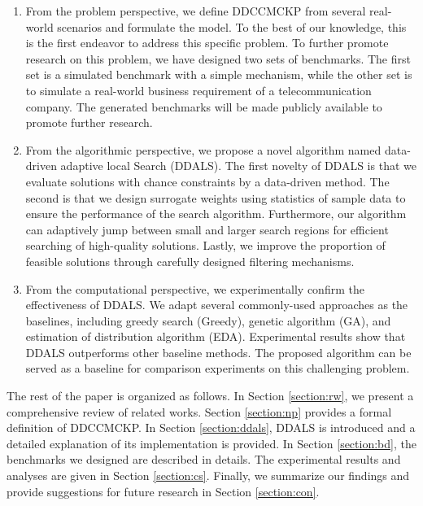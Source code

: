\documentclass[lettersize,journal]{IEEEtran}
\begin{document}
\begin{enumerate}
\item 
From the problem perspective, we define DDCCMCKP from several real-world scenarios and formulate the model. 
To the best of our knowledge, this is the first endeavor to address this specific problem. 
To further promote research on this problem, we have designed two sets of benchmarks. 
The first set is a simulated benchmark with a simple mechanism, while the other set is to simulate a real-world business requirement of a telecommunication company.
The generated benchmarks will be made publicly available to promote further research.

\item 
From the algorithmic perspective, we propose a novel algorithm named data-driven adaptive local Search (DDALS). 
The first novelty of DDALS is that we evaluate solutions with chance constraints by a data-driven method. 
The second is that we design surrogate weights using statistics of sample data to ensure the performance of the search algorithm. 
Furthermore, our algorithm can adaptively jump between small and larger search regions for efficient searching of high-quality solutions. 
Lastly, we improve the proportion of feasible solutions through carefully designed filtering mechanisms.

\item From the computational perspective, we experimentally confirm the effectiveness of DDALS.
We adapt several commonly-used approaches as the baselines, including greedy search (Greedy), genetic algorithm (GA), and estimation of distribution algorithm (EDA). 
Experimental results show that DDALS outperforms other baseline methods.
The proposed algorithm can be served as a baseline for comparison experiments on this challenging problem.
\end{enumerate}

The rest of the paper is organized as follows.
In Section \ref{section:rw}, we present a comprehensive review of related works. 
Section \ref{section:np} provides a formal definition of DDCCMCKP. 
In Section \ref{section:ddals}, DDALS is introduced and a detailed explanation of its implementation is provided. 
In Section \ref{section:bd}, the benchmarks we designed are described in details. 
The experimental results and analyses are given in Section \ref{section:cs}. 
Finally, we summarize our findings and provide suggestions for future research in Section \ref{section:con}.
\end{document}
